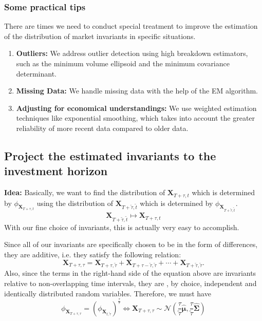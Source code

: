 \documentclass[13pt]{article}
\theoremstyle{definition}
\theoremstyle{remark}
\begin{document}
\subsubsection{Some practical tips}There are times we need to conduct special treatment to improve the estimation of the distribution of market invariants in specific situations.
\begin{enumerate}
    \item \textbf{Outliers:} We address outlier detection using high breakdown estimators, such as the minimum volume ellipsoid and the minimum covariance determinant.
    \item \textbf{Missing Data:} We handle missing data with the help of the EM algorithm.
    \item \textbf{Adjusting for economical understandings:} We use weighted estimation techniques like exponential smoothing, which takes into account the greater reliability of more recent data compared to older data.
\end{enumerate}




\subsection{Project the estimated invariants to the investment horizon}
{\color{C6}\textbf{Idea:} Basically, we want to find the distribution of $\boldsymbol{X}_{T+\tau, t}$ which is determined by $\phi_{\boldsymbol{X}_{T+\tau, t}}$ using the distribution of $\boldsymbol{X}_{T+\tilde{\tau}, \tilde{t}}$ which is determined by $
\phi_{\boldsymbol{X}_{T+\tilde{\tau}, \tilde{t}}}
$. 
\[
\boldsymbol{X}_{T+\tilde{\tau}, \tilde{t}} \mapsto \boldsymbol{X}_{T+\tau, t}
\]
With our fine choice of invariants, this is actually very easy to accomplish.}

Since all of our invariants are specifically chosen to be in the form of differences, they are additive, i.e. they satisfy the following relation:
$$
\mathbf{X}_{T+\tau, \tau}=\mathbf{X}_{T+\tau, \tilde{\tau}}+\mathbf{X}_{T+\tau-\tilde{\tau}, \tilde{\tau}}+\cdots+\mathbf{X}_{T+\tilde{\tau}, \tilde{\tau}} .
$$
Also, since the terms in the right-hand side of the equation above are invariants relative to non-overlapping time intervals, they are , by choice, independent and identically distributed random variables. Therefore, we must have
$$
\phi_{\mathbf{X}_{T+\tau, \tau}}=\left(\phi_{\mathbf{X}_{t, \tilde{\tau}}}\right)^{\frac{\tau}{\tau}}\Longleftrightarrow 
\mathbf{X}_{T+\tau, \tau} \sim \mathcal{N}\left(\frac{\tau}{\widetilde{\tau}} \widehat{\boldsymbol{\mu}}, \frac{\tau}{\widetilde{\tau}} \widehat{\boldsymbol{\Sigma}}\right) 
$$
\end{document}
